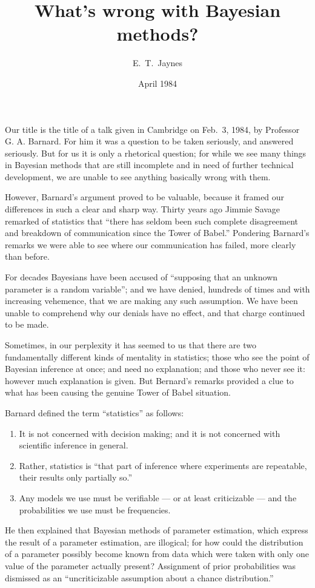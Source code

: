 \documentclass[12pt]{article}
\title{What's wrong with Bayesian methods?}
\author{E.~T.~Jaynes}
\date{April 1984}
\affil{St.~John's College and Cavendish Laboratory, Cambridge, CB2 1TP, UK}
\begin{document}
\maketitle


%
%

Our title is the title of a talk given in Cambridge on Feb.~3, 1984, by Professor G. A. Barnard. For him it was a question
to be taken seriously, and answered seriously. But for us it is
only a rhetorical question; for while we see many things in
Bayesian methods that are still incomplete and in need of
further technical development, we are unable to see anything
basically wrong with them.

However, Barnard's argument proved to be valuable, because
it framed our differences in such a clear and sharp way. Thirty
years ago Jimmie Savage remarked of statistics that ``there has
seldom been such complete disagreement and breakdown of
communication since the Tower of Babel.'' Pondering Barnard's
remarks we were able to see where our communication has failed,
more clearly than before.

For decades Bayesians have been accused of ``supposing that
an unknown parameter is a random variable''; and we have denied,
hundreds of times and with increasing vehemence, that we are
making any such assumption. We have been unable to comprehend
why our denials have no effect, and that charge continued to be
made.

Sometimes, in our perplexity it has seemed to us that there are two fundamentally different kinds of mentality in
statistics; those who see the point of Bayesian inference at
once; and need no explanation; and those who never see it:
however much explanation is given. But Bernard's remarks
provided a clue to what has been causing the genuine Tower of Babel situation.

Barnard defined the term ``statistics'' as follows:
\begin{enumerate}[label=(\Alph*)]
\item It is
not concerned with decision making; and it is not concerned
with scientific inference in general.
\item Rather, statistics is
``that part of inference where experiments are repeatable, their
results only partially so.''
\item Any models we use must be verifiable --- or at least criticizable --- and the probabilities
we use must be frequencies.
\end{enumerate}
He then explained that Bayesian methods of parameter estimation, which express the result of a parameter
estimation, are illogical; for how could the distribution of
a parameter possibly become known from data which were taken
with only one value of the parameter actually present?
Assignment of prior probabilities was dismissed as an
``uncriticizable assumption about a chance distribution.''
\end{document}
